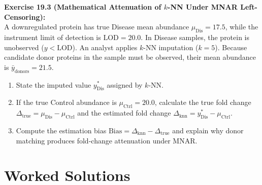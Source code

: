 \documentclass[11pt,oneside]{book}
\begin{document}
\vspace{0.8em}
\noindent
\textbf{Exercise 19.3 (Mathematical Attenuation of $k$-NN Under MNAR Left-Censoring):}\\
A downregulated protein has true Disease mean abundance $\mu_{\text{Dis}} = 17.5$, while the instrument limit of detection is $\text{LOD} = 20.0$. In Disease samples, the protein is unobserved ($y < \text{LOD}$). An analyst applies $k$-NN imputation ($k = 5$). Because candidate donor proteins in the sample must be observed, their mean abundance is $\bar{y}_{\text{donors}} = 21.5$.
\begin{enumerate}
    \item State the imputed value $y_{\text{Dis}}^*$ assigned by $k$-NN.
    \item If the true Control abundance is $\mu_{\text{Ctrl}} = 20.0$, calculate the true fold change $\Delta_{\text{true}} = \mu_{\text{Dis}} - \mu_{\text{Ctrl}}$ and the estimated fold change $\Delta_{\text{knn}} = y_{\text{Dis}}^* - \mu_{\text{Ctrl}}$.
    \item Compute the estimation bias $\text{Bias} = \Delta_{\text{knn}} - \Delta_{\text{true}}$ and explain why donor matching produces fold-change attenuation under MNAR.
\end{enumerate}

\section{Worked Solutions}
\end{document}
